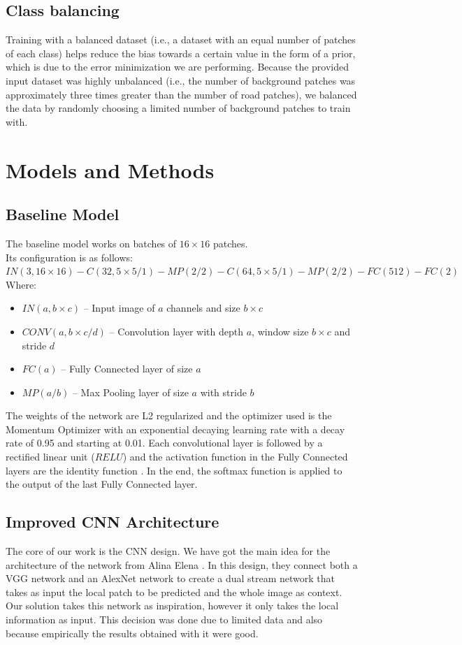 \documentclass[10pt,conference,compsocconf]{IEEEtran}
\begin{document}
\subsection{Class balancing}
\label{sec:balance}
Training with a balanced dataset (i.e., a dataset with an equal number of
patches of each class) helps reduce the bias towards a certain value in the
form of a prior, which is due to the error minimization we are performing.
Because the provided input dataset was highly unbalanced (i.e., the number of
background patches was approximately three times greater than the number of
road patches), we balanced the data by randomly choosing a limited number of
background patches to train with. 


\section{Models and Methods}
\label{sec:model_and_methods}
\subsection{Baseline Model}
The baseline model works on batches of $16 \times 16$ patches.\\
 Its configuration is as follows:
 $IN(3, 16\times16)
-C(32, 5\times5 /1) - MP(2 / 2) - C(64, 5\times5 /1) - MP(2 / 2)
-FC(512)-FC(2)$\\
Where:
\begin{itemize}
\item $IN(a,b\times c)$ -- Input image of $a$ channels and size $b \times  c$
\item $CONV(a,b\times c / d)$ -- Convolution layer with depth $a$, window size $b\times c$ and stride $d$
\item $FC(a)$ -- Fully Connected layer of size $a$
\item $MP(a / b)$ -- Max Pooling layer of size $a$ with stride $b$
\end{itemize}

The weights of the network are L2 regularized and the optimizer used is the Momentum Optimizer  with an exponential decaying learning rate with a decay rate of 0.95 and starting at 0.01.
Each convolutional layer is followed by a rectified linear unit ($RELU$) and the activation function in the Fully Connected layers are the identity function .
In the end, the softmax function is applied to the output of the last Fully Connected layer. 
\subsection{Improved CNN Architecture}
The core of our work is the CNN design. We have got the main idea for the architecture
of the network from Alina Elena \cite{mthesis}. In this design, they connect both a VGG network \cite{vgg} and an AlexNet network \cite{alexnet} to create a dual stream network that takes as input the local patch to be predicted and the whole image as context.
Our solution takes this network as inspiration, however it only takes the local information as input. This decision was done due to limited data and also because empirically the results obtained with it were good.
\end{document}
